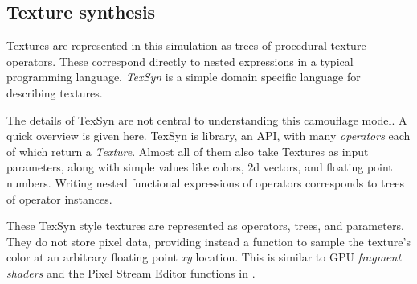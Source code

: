 \documentclass[acmtog]{acmart}
\newcommand{\jargon}[1]{\textit{#1}}
\begin{document}
\subsection{Texture synthesis}
Textures are represented in this simulation as trees of procedural texture operators. These correspond directly to nested expressions in a typical programming language. \jargon{TexSyn} is a simple domain specific language for describing textures.
\par
The details of TexSyn are not central to understanding this camouflage model. A quick overview is given here. TexSyn is library, an API, with many \jargon{operators} each of which return a \jargon{Texture}. Almost all of them also take Textures as input parameters, along with simple values like colors, 2d vectors, and floating point numbers. Writing nested functional expressions of operators corresponds to trees of operator instances.
\par
These TexSyn style textures are represented as operators, trees, and parameters. They do not store pixel data, providing instead a function to sample the texture's color at an arbitrary floating point \textit{xy} location. This is similar to GPU \jargon{fragment shaders} and the Pixel Stream Editor functions in \cite{perlin_image_1985}.
\par
[... see Figure \ref{fig:TexSyn_overview} ...]
\par
 [... moved to here from Related Work: ... These textures are object-oriented so specific types are implemented as (c++) classes, with specific parameters stored in instances. The base class provides interfaces for operations such as returning a color for a given position on the (infinite) texture plane. ...]
 \par

\end{document}
